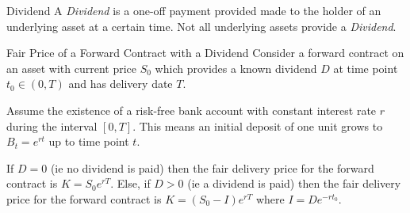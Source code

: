 \documentclass[11pt,a4paper]{article}
\begin{document}
  \begin{definition}{Dividend}
    A \textit{Dividend} is a one-off payment provided made to the holder of an underlying asset at a certain time. Not all underlying assets provide a \textit{Dividend}.
  \end{definition}

  \begin{proposition}{Fair Price of a Forward Contract with a Dividend}\label{prop_fair_price_of_forward_w_dividend}
    Consider a forward contract on an asset with current price $S_0$ which provides a known dividend $D$ at time point $t_0\in(0,T)$ and has delivery date $T$.
    \par Assume the existence of a risk-free bank account with constant interest rate $r$ during the interval $[0,T]$. This means an initial deposit of one unit grows to $B_t=e^{rt}$ up to time point $t$.
    \par If $D=0$ (ie no dividend is paid) then the fair delivery price for the forward contract is $K=S_0e^{rT}$. Else, if $D>0$ (ie a dividend is paid) then the fair delivery price for the forward contract is $K=(S_0-I)e^{rT}$ where $I=De^{-rt_0}$.
  \end{proposition}
\end{document}
